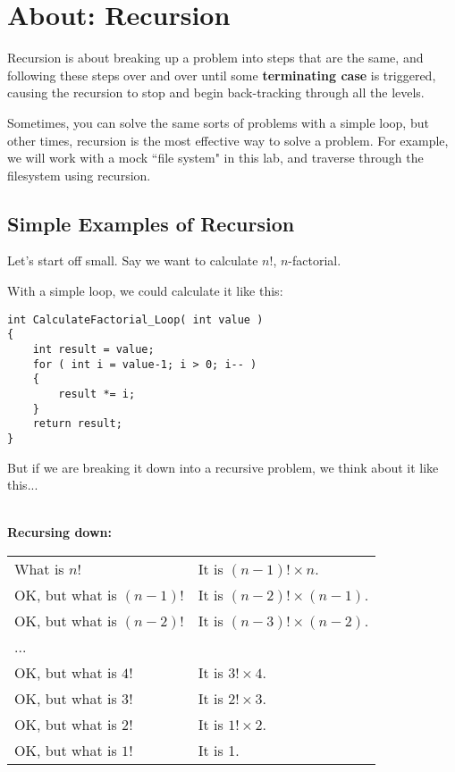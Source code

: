 \documentclass[a4paper,12pt,oneside]{book}
\begin{document}
        

\tableofcontents

\section{About: Recursion}

Recursion is about breaking up a problem into steps that are the same,
and following these steps over and over until some \textbf{terminating case}
is triggered, causing the recursion to stop and begin back-tracking through
all the levels.

Sometimes, you can solve the same sorts of problems with a simple loop,
but other times, recursion is the most effective way to solve a problem.
For example, we will work with a mock ``file system" in this lab,
and traverse through the filesystem using recursion.

\subsection{Simple Examples of Recursion}

Let's start off small. Say we want to calculate $n!$, $n$-factorial.

With a simple loop, we could calculate it like this:

\begin{lstlisting}[style=code]
int CalculateFactorial_Loop( int value )
{
    int result = value;
    for ( int i = value-1; i > 0; i-- )
    {
        result *= i;
    }
    return result;
}
\end{lstlisting}

But if we are breaking it down into a recursive problem, we think about it like this...

~\\
\textbf{Recursing down:}
~\\

\begin{tabular}{p{6cm} p{6cm}}
    
    What is $n!$ & It is $(n-1)! \times n$.
    \\ 
    OK, but what is $(n-1)!$ & It is $(n-2)! \times (n-1)$.
    \\
    OK, but what is $(n-2)!$ & It is $(n-3)! \times (n-2)$.
    \\
    ...
    \\
    OK, but what is $4!$ & It is $3! \times 4$.
    \\
    OK, but what is $3!$ & It is $2! \times 3$.
    \\
    OK, but what is $2!$ & It is $1! \times 2$.
    \\
    OK, but what is $1!$ & It is 1.
\end{tabular}
\end{document}
